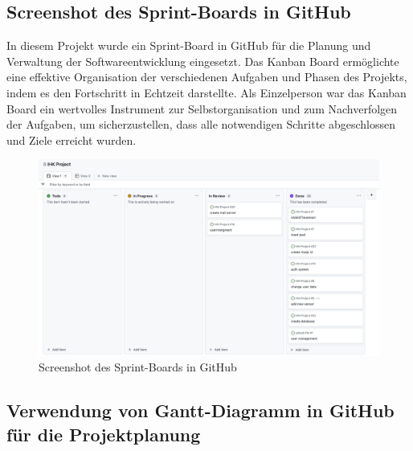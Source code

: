 \subsection{Screenshot des Sprint-Boards in GitHub}\label{appendix:a7}\par


In diesem Projekt wurde ein Sprint-Board in GitHub für die Planung und Verwaltung der Softwareentwicklung eingesetzt. Das Kanban Board ermöglichte eine effektive Organisation der verschiedenen Aufgaben und Phasen des Projekts, indem es den Fortschritt in Echtzeit darstellte. Als Einzelperson war das Kanban Board ein wertvolles Instrument zur Selbstorganisation und zum Nachverfolgen der Aufgaben, um sicherzustellen, dass alle notwendigen Schritte abgeschlossen und Ziele erreicht wurden.

\begin{figure}[h]
	\centering
	\includegraphics[width=1\textwidth]{img/github_canban.png}
	\caption{Screenshot des Sprint-Boards in GitHub}
	\label{fig:example}
\end{figure}
\clearpage

\subsection{Verwendung von Gantt-Diagramm in GitHub für die Projektplanung}\label{appendix:a8}\par

